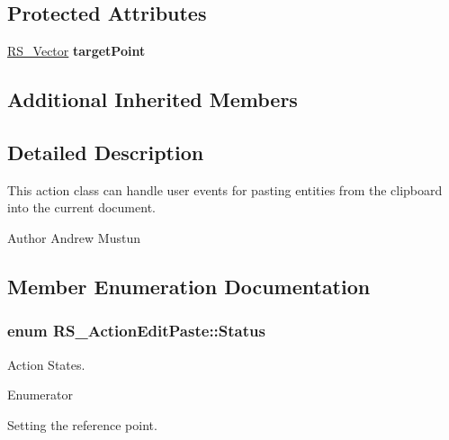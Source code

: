 \subsection*{Protected Attributes}
\begin{DoxyCompactItemize}
\item 
\hypertarget{classRS__ActionEditPaste_aa94c605e11bd657edd867e81055ee424}{\hyperlink{classRS__Vector}{R\-S\-\_\-\-Vector} {\bfseries target\-Point}}\label{classRS__ActionEditPaste_aa94c605e11bd657edd867e81055ee424}

\end{DoxyCompactItemize}
\subsection*{Additional Inherited Members}


\subsection{Detailed Description}
This action class can handle user events for pasting entities from the clipboard into the current document.

\begin{DoxyAuthor}{Author}
Andrew Mustun 
\end{DoxyAuthor}


\subsection{Member Enumeration Documentation}
\hypertarget{classRS__ActionEditPaste_a62a4fec76d478a15a268e05d776669a5}{
\subsubsection[{Status}]{\setlength{\rightskip}{0pt plus 5cm}enum {\bf R\-S\-\_\-\-Action\-Edit\-Paste\-::\-Status}}}\label{classRS__ActionEditPaste_a62a4fec76d478a15a268e05d776669a5}
Action States. \begin{Desc}
\item[Enumerator]\par
\begin{description}
\item[{\em 
\hypertarget{classRS__ActionEditPaste_a62a4fec76d478a15a268e05d776669a5aefbd837f53eb7762becc440909ca56cb}{Set\-Target\-Point}\label{classRS__ActionEditPaste_a62a4fec76d478a15a268e05d776669a5aefbd837f53eb7762becc440909ca56cb}
}]Setting the reference point. \end{description}
\end{Desc}


